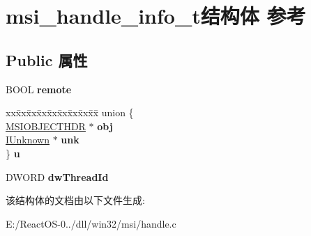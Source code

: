 \hypertarget{structmsi__handle__info__t}{}\section{msi\+\_\+handle\+\_\+info\+\_\+t结构体 参考}
\label{structmsi__handle__info__t}
\subsection*{Public 属性}
\begin{DoxyCompactItemize}
\item 
\mbox{\label{structmsi__handle__info__t_af6a6a14ba379c7939d4857359c3c8841}} 
B\+O\+OL {\bfseries remote}
\item 
\mbox{\label{structmsi__handle__info__t_adc6d65b5972b04961ad1f7615118c8c6}} 
\begin{tabbing}
xx\=xx\=xx\=xx\=xx\=xx\=xx\=xx\=xx\=\kill
union \{\\
\>\hyperlink{structtag_m_s_i_o_b_j_e_c_t_h_d_r}{MSIOBJECTHDR} $\ast$ {\bfseries obj}\\
\>\hyperlink{interface_i_unknown}{IUnknown} $\ast$ {\bfseries unk}\\
\} {\bfseries u}\\

\end{tabbing}\item 
\mbox{\label{structmsi__handle__info__t_a017ca93bd187548e650f1ecb1007d9ed}} 
D\+W\+O\+RD {\bfseries dw\+Thread\+Id}
\end{DoxyCompactItemize}


该结构体的文档由以下文件生成\+:\begin{DoxyCompactItemize}
\item 
E\+:/\+React\+O\+S-\/0../dll/win32/msi/handle.\+c\end{DoxyCompactItemize}
